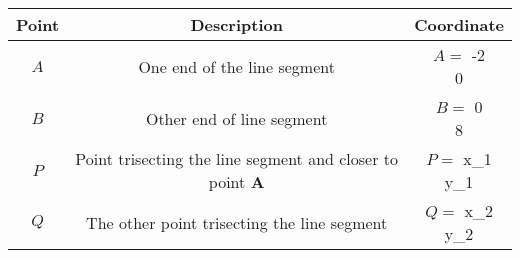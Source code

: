 \begin{center}
    \begin{tabular}{|c|c|c|} 
        \hline
            \textbf{Point} & \textbf{Description} & \textbf{Coordinate} \\ 
        \hline
            $A$   & One end of the line segment & $A =$ \myvec{-2 \\ 0} \\ 
        \hline
            $B$   & Other end of line segment & $B =$ \myvec{0 \\ 8}\\ 
        \hline
	    $P$   & Point trisecting the line segment and closer to point \textbf{A} & $P  =$ \myvec{x_1 \\ y_1}\\ 
        \hline
	    $Q$   & The other point trisecting the line segment & $Q  =$ \myvec{x_2 \\ y_2}\\ 
	    \hline
    \end{tabular}
\end{center}  
